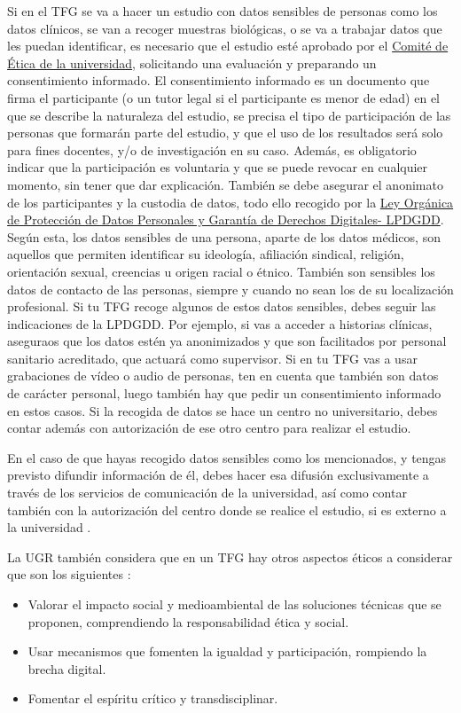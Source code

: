 Si en el TFG se va a hacer un estudio con datos sensibles de personas como los datos clínicos, se van a recoger muestras biológicas, o se va a trabajar datos que les puedan identificar, es necesario que el estudio esté aprobado por el \href{https://investigacion.ugr.es/informacion/presentacion/apoyo/comite-etica/evaluacion}{Comité de Ética de la universidad}, solicitando una evaluación y preparando un consentimiento informado. El consentimiento informado es un documento que firma el participante (o un tutor legal si el participante es menor de edad) en el que se describe la naturaleza del estudio, se precisa el tipo de participación de las personas que formarán parte del estudio, y que el uso de los resultados será solo para fines docentes, y/o de investigación en su caso. Además, es obligatorio indicar que la participación es voluntaria y que se puede revocar en cualquier momento, sin tener que dar explicación. También se debe asegurar el anonimato de los participantes y la custodia de datos, todo ello recogido por la \href{https://www.boe.es/buscar/act.php?id=BOE-A-2018-16673}{Ley Orgánica de Protección de Datos Personales y Garantía de Derechos Digitales- LPDGDD}.  Según esta, los datos sensibles de una persona, aparte de los datos médicos, son aquellos que permiten identificar su ideología, afiliación sindical, religión, orientación sexual, creencias u origen racial o étnico. También son sensibles los datos de contacto de las personas, siempre y cuando no sean los de su localización profesional. Si tu TFG recoge algunos de estos datos sensibles, debes seguir las indicaciones de la LPDGDD. Por ejemplo, si vas a acceder a historias clínicas, aseguraos que los datos estén ya anonimizados y que son facilitados por personal sanitario acreditado, que actuará como supervisor. Si en tu TFG vas a usar grabaciones de vídeo o audio de personas, ten en cuenta que también son datos de carácter personal, luego también hay que pedir un consentimiento informado en estos casos. Si la recogida de datos se hace un centro no universitario, debes contar además con autorización de ese otro centro para realizar el estudio.

En el caso de que hayas recogido datos sensibles como los mencionados, y tengas previsto difundir información de él, debes hacer esa difusión exclusivamente a través de los servicios de comunicación de la universidad, así como contar también con la autorización del centro donde se realice el estudio, si es externo a la universidad \cite{EticaUGR}.

La UGR también considera que en un TFG hay otros aspectos éticos a considerar que son los siguientes \cite{EticaUGR}:
\begin{itemize}
    \item Valorar el impacto social y medioambiental de las soluciones técnicas que se proponen, comprendiendo la responsabilidad ética y social.
    \item Usar mecanismos que fomenten la igualdad y participación, rompiendo la brecha digital.
    \item Fomentar el espíritu crítico y transdisciplinar.
\end{itemize}

